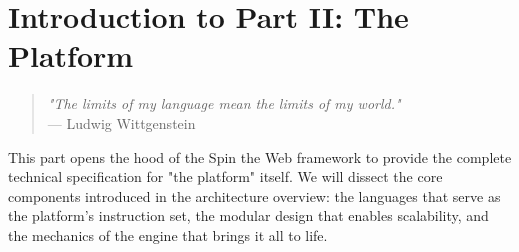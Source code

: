 
\chapter*{Introduction to Part II: The Platform}
\label{part:framework-mechanics}

\begin{quote}
\textit{"The limits of my language mean the limits of my world."} \\
— Ludwig Wittgenstein
\end{quote}

This part opens the hood of the Spin the Web framework to provide the complete technical specification for "the platform" itself. We will dissect the core components introduced in the architecture overview: the languages that serve as the platform's instruction set, the modular design that enables scalability, and the mechanics of the engine that brings it all to life.

